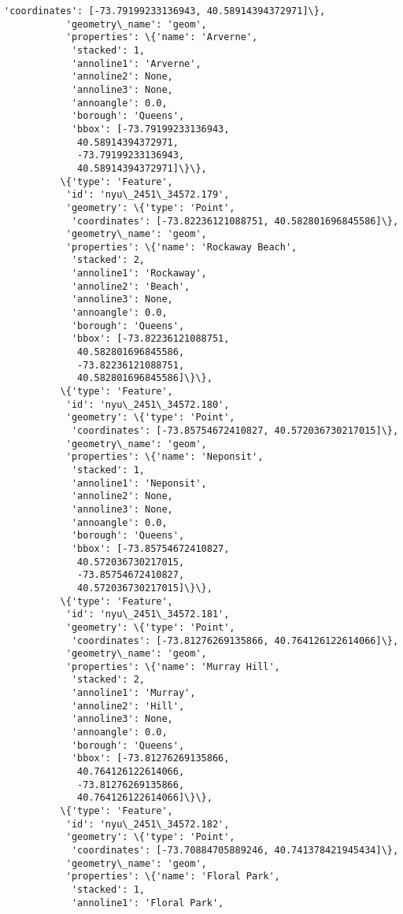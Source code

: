 \documentclass[11pt]{article}
\begin{document}
\begin{Verbatim}[commandchars=\\\{\}]
            'coordinates': [-73.79199233136943, 40.58914394372971]\},
           'geometry\_name': 'geom',
           'properties': \{'name': 'Arverne',
            'stacked': 1,
            'annoline1': 'Arverne',
            'annoline2': None,
            'annoline3': None,
            'annoangle': 0.0,
            'borough': 'Queens',
            'bbox': [-73.79199233136943,
             40.58914394372971,
             -73.79199233136943,
             40.58914394372971]\}\},
          \{'type': 'Feature',
           'id': 'nyu\_2451\_34572.179',
           'geometry': \{'type': 'Point',
            'coordinates': [-73.82236121088751, 40.582801696845586]\},
           'geometry\_name': 'geom',
           'properties': \{'name': 'Rockaway Beach',
            'stacked': 2,
            'annoline1': 'Rockaway',
            'annoline2': 'Beach',
            'annoline3': None,
            'annoangle': 0.0,
            'borough': 'Queens',
            'bbox': [-73.82236121088751,
             40.582801696845586,
             -73.82236121088751,
             40.582801696845586]\}\},
          \{'type': 'Feature',
           'id': 'nyu\_2451\_34572.180',
           'geometry': \{'type': 'Point',
            'coordinates': [-73.85754672410827, 40.572036730217015]\},
           'geometry\_name': 'geom',
           'properties': \{'name': 'Neponsit',
            'stacked': 1,
            'annoline1': 'Neponsit',
            'annoline2': None,
            'annoline3': None,
            'annoangle': 0.0,
            'borough': 'Queens',
            'bbox': [-73.85754672410827,
             40.572036730217015,
             -73.85754672410827,
             40.572036730217015]\}\},
          \{'type': 'Feature',
           'id': 'nyu\_2451\_34572.181',
           'geometry': \{'type': 'Point',
            'coordinates': [-73.81276269135866, 40.764126122614066]\},
           'geometry\_name': 'geom',
           'properties': \{'name': 'Murray Hill',
            'stacked': 2,
            'annoline1': 'Murray',
            'annoline2': 'Hill',
            'annoline3': None,
            'annoangle': 0.0,
            'borough': 'Queens',
            'bbox': [-73.81276269135866,
             40.764126122614066,
             -73.81276269135866,
             40.764126122614066]\}\},
          \{'type': 'Feature',
           'id': 'nyu\_2451\_34572.182',
           'geometry': \{'type': 'Point',
            'coordinates': [-73.70884705889246, 40.741378421945434]\},
           'geometry\_name': 'geom',
           'properties': \{'name': 'Floral Park',
            'stacked': 1,
            'annoline1': 'Floral Park',

\end{Verbatim}
\end{document}
